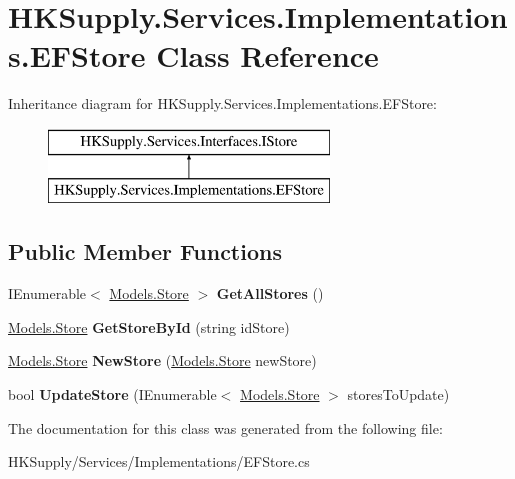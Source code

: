 \hypertarget{class_h_k_supply_1_1_services_1_1_implementations_1_1_e_f_store}{}\section{H\+K\+Supply.\+Services.\+Implementations.\+E\+F\+Store Class Reference}
\label{class_h_k_supply_1_1_services_1_1_implementations_1_1_e_f_store}
Inheritance diagram for H\+K\+Supply.\+Services.\+Implementations.\+E\+F\+Store\+:\begin{figure}[H]
\begin{center}
\leavevmode
\includegraphics[height=2.000000cm]{class_h_k_supply_1_1_services_1_1_implementations_1_1_e_f_store}
\end{center}
\end{figure}
\subsection*{Public Member Functions}
\begin{DoxyCompactItemize}
\item 
\mbox{\label{class_h_k_supply_1_1_services_1_1_implementations_1_1_e_f_store_ae4b68dd27aa7153f55dfbfc3fb3e940f}} 
I\+Enumerable$<$ \hyperlink{class_h_k_supply_1_1_models_1_1_store}{Models.\+Store} $>$ {\bfseries Get\+All\+Stores} ()
\item 
\mbox{\label{class_h_k_supply_1_1_services_1_1_implementations_1_1_e_f_store_a528ad1b9410f30aaf17eb8e7134f8f68}} 
\hyperlink{class_h_k_supply_1_1_models_1_1_store}{Models.\+Store} {\bfseries Get\+Store\+By\+Id} (string id\+Store)
\item 
\mbox{\label{class_h_k_supply_1_1_services_1_1_implementations_1_1_e_f_store_a73de0913d4fdcf03f41bd65004c90aab}} 
\hyperlink{class_h_k_supply_1_1_models_1_1_store}{Models.\+Store} {\bfseries New\+Store} (\hyperlink{class_h_k_supply_1_1_models_1_1_store}{Models.\+Store} new\+Store)
\item 
\mbox{\label{class_h_k_supply_1_1_services_1_1_implementations_1_1_e_f_store_ae82f4be82d405b74217046960018b1c5}} 
bool {\bfseries Update\+Store} (I\+Enumerable$<$ \hyperlink{class_h_k_supply_1_1_models_1_1_store}{Models.\+Store} $>$ stores\+To\+Update)
\end{DoxyCompactItemize}


The documentation for this class was generated from the following file\+:\begin{DoxyCompactItemize}
\item 
H\+K\+Supply/\+Services/\+Implementations/E\+F\+Store.\+cs\end{DoxyCompactItemize}
